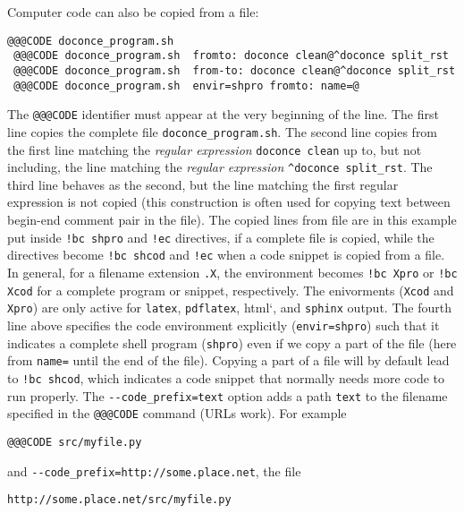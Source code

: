 \documentclass[%
oneside,                 %
final,                   %
10pt]{article}
\newcounter{doconce:movie:counter}
\begin{document}
Computer code can also be copied from a file:
\begin{Verbatim}[numbers=none,fontsize=\fontsize{9pt}{9pt},baselinestretch=0.95,xleftmargin=2mm]
 @@@CODE doconce_program.sh
 @@@CODE doconce_program.sh  fromto: doconce clean@^doconce split_rst
 @@@CODE doconce_program.sh  from-to: doconce clean@^doconce split_rst
 @@@CODE doconce_program.sh  envir=shpro fromto: name=@

\end{Verbatim}

The \texttt{@@@CODE} identifier must appear at the very beginning of the line.
The first line copies the complete file \Verb!doconce_program.sh!.
The second line copies from the first line matching the \emph{regular
expression} \texttt{doconce clean} up to, but not including, the line
matching the \emph{regular expression} \Verb!^doconce split_rst!.
The third line behaves as the second, but the line matching
the first regular expression is not copied (this construction is often
used for copying text between begin-end comment pair in the file).
The copied lines from file are in this example put inside \Verb?!bc shpro?
and \Verb?!ec? directives, if a complete file is copied, while the
directives become \Verb?!bc shcod? and \Verb?!ec? when a code snippet is copied
from a file. In general, for a filename extension \texttt{.X}, the environment
becomes \Verb?!bc Xpro? or \Verb?!bc Xcod? for a complete program or snippet,
respectively. The enivorments (\texttt{Xcod} and \texttt{Xpro}) are only active for
\texttt{latex}, \texttt{pdflatex}, html`, and \texttt{sphinx} output.  The fourth line
above specifies the code environment explicitly (\texttt{envir=shpro}) such
that it indicates a complete shell program (\texttt{shpro}) even if we copy a
part of the file (here from \texttt{name=} until the end of the file).
Copying a part of a file will by default lead to \Verb?!bc shcod?, which indicates a
code snippet that normally needs more code to run properly.
The \Verb!--code_prefix=text! option adds a path \texttt{text} to the filename specified
in the \texttt{@@@CODE} command (URLs work). For example
\begin{Verbatim}[numbers=none,fontsize=\fontsize{9pt}{9pt},baselinestretch=0.95,xleftmargin=2mm]
 @@@CODE src/myfile.py

\end{Verbatim}

and \Verb!--code_prefix=http://some.place.net!, the file
\begin{Verbatim}[numbers=none,fontsize=\fontsize{9pt}{9pt},baselinestretch=0.95,xleftmargin=2mm]
http://some.place.net/src/myfile.py

\end{Verbatim}
\end{document}
